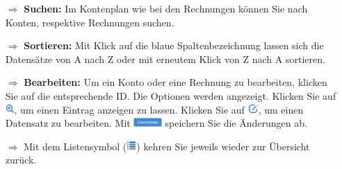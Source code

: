 \documentclass{article}
\begin{document}
\begin{multicols}{2}
\begin{tcolorbox}[colback=blue!5,colframe=blue!40!black,title=Weitere Funktionen im Controlling]
\begin{itemize}
  \item[$\Longrightarrow$] \textbf{Suchen:} Im Kontenplan wie bei den Rechnungen können Sie nach Konten, respektive Rechnungen suchen.
  \item[$\Longrightarrow$] \textbf{Sortieren:} Mit Klick auf die blaue Spaltenbezeichnung lassen sich die Datensätze von A nach Z oder mit erneutem Klick von Z nach A sortieren.
  \item[$\Longrightarrow$] \textbf{Bearbeiten:} Um ein Konto oder eine Rechnung zu bearbeiten, klicken Sie auf die entsprechende ID. Die Optionen werden angezeigt. Klicken Sie auf \includegraphics[height=10pt]{Icons/Lupe.png}, um einen Eintrag anzeigen zu lassen. Klicken Sie auf \includegraphics[height=10pt]{Icons/bearbeiten.png}, um einen Datensatz zu bearbeiten. Mit \includegraphics[height=10pt]{Icons/B_Uebernehmen.jpg} speichern Sie die Änderungen ab.
	\item[$\Longrightarrow$] Mit dem Listensymbol (\includegraphics[height=10pt]{Icons/Listensymbol_zurueck.png}) kehren Sie jeweils wieder zur Übersicht zurück.
\end{itemize}
\end{tcolorbox}


\end{multicols}



\pagebreak


\vspace{\baselineskip}


\end{document}
